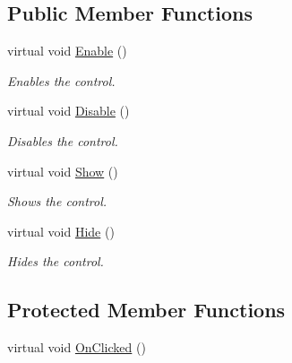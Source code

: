 \subsection*{Public Member Functions}
\begin{DoxyCompactItemize}
\item 
virtual void \hyperlink{class_tri_devs_1_1_tri_engine2_d_1_1_u_i_1_1_control_af0927254d6268f4d8548ff04e6043dd4}{Enable} ()
\begin{DoxyCompactList}\small\item\em Enables the control. \end{DoxyCompactList}\item 
virtual void \hyperlink{class_tri_devs_1_1_tri_engine2_d_1_1_u_i_1_1_control_ab8b829726e23d822e1b65f9355386bcf}{Disable} ()
\begin{DoxyCompactList}\small\item\em Disables the control. \end{DoxyCompactList}\item 
virtual void \hyperlink{class_tri_devs_1_1_tri_engine2_d_1_1_u_i_1_1_control_a5be351a3f27e9acf27542b83291c8651}{Show} ()
\begin{DoxyCompactList}\small\item\em Shows the control. \end{DoxyCompactList}\item 
virtual void \hyperlink{class_tri_devs_1_1_tri_engine2_d_1_1_u_i_1_1_control_aab4cd69da19b9bdfd232bdcfdad8131c}{Hide} ()
\begin{DoxyCompactList}\small\item\em Hides the control. \end{DoxyCompactList}\end{DoxyCompactItemize}
\subsection*{Protected Member Functions}
\begin{DoxyCompactItemize}
\item 
virtual void \hyperlink{class_tri_devs_1_1_tri_engine2_d_1_1_u_i_1_1_control_aa5d2b95535bb697420b640e5db72bc48}{On\-Clicked} ()
\end{DoxyCompactItemize}
